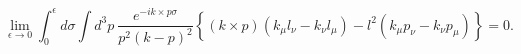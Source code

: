 \begin{equation}
    \lim_{\epsilon \to 0}
    \int_0^{\epsilon} d \sigma
    \int d^3 p~
    \frac{e^{-i k \times p \sigma}}
         {p^2 (k-p)^2}
    \left\{
    (k \times p) (k_\mu l_\nu - k_\nu l_\mu)
    - l^2 (k_\mu p_\nu - k_\nu p_\mu) \right\} = 0.
\label{finiteness}
\end{equation}

